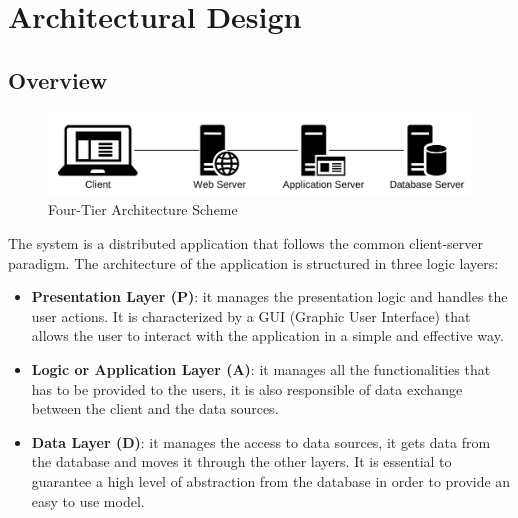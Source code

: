 \documentclass[table, 12pt]{article}
\begin{document}
\newpage
\section{Architectural Design}

\subsection{Overview}
\begin{center}
    \begin{figure}[H]
        \includegraphics[scale=0.55, center]{assets/4-tier-scheme.jpg}
        \caption{Four-Tier Architecture Scheme}
        \label{fig: four-tier-architecture-scheme}
    \end{figure}
\end{center}

The system is a distributed application that follows the common client-server paradigm.
The architecture of the application is structured in three logic layers:
\begin{itemize}
    \item \textbf{Presentation Layer (P)}: it manages the presentation logic and handles the user actions.
    It is characterized by a GUI (Graphic User Interface) that allows the user to interact with the application in a simple and effective way.
    \item \textbf{Logic or Application Layer (A)}: it manages all the functionalities that has to be provided to the users, it is also responsible of data exchange between the client and the data sources.
    \item \textbf{Data Layer (D)}: it manages the access to data sources, it gets data from the database and moves it through the other layers.
    It is essential to guarantee a high level of abstraction from the database in order to provide an easy to use model.
\end{itemize}
\end{document}
